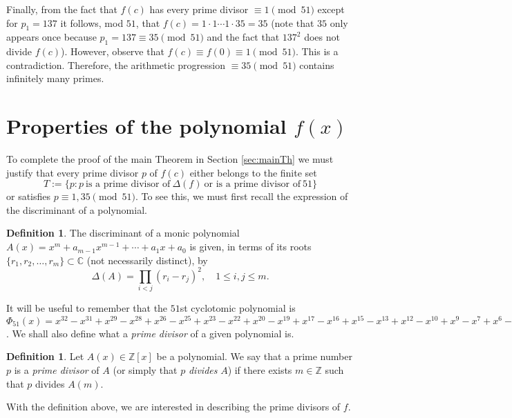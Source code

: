 \documentclass[a4paper, 12pt]{article}
\theoremstyle{definition}
\newtheorem{definition}[theorem]{Definition}
\newcommand{\Z}{\ensuremath{\mathbb{Z}}}
\newcommand{\C}{\ensuremath{\mathbb{C}}}
\begin{document}
Finally, from the fact that $f(c)$ has every prime divisor $\equiv 1 \pmod{51}$ except for $p_{1}=137$ it follows, mod $51$, that $f(c)=1\cdot1\cdots 1\cdot35=35$ (note that $35$ only appears once because $p_{1}=137\equiv35\pmod{51}$ and the fact that $137^2$ does not divide $f(c)$). However, observe that $f(c)\equiv f(0)\equiv 1\pmod{51}$. This is a contradiction. Therefore, the arithmetic progression $\equiv 35\pmod{51}$ contains infinitely many primes.

\section{Properties of the polynomial \texorpdfstring{$f(x)$}{fx}}\label{sec:properties}
 
To complete the proof of the main Theorem in Section \ref{sec:mainTh} we must justify that every prime divisor $p$ of $f(c)$ either belongs to the finite set 
\begin{equation*}
T:=\{p: p \ \text{is a prime divisor of} \ \Delta(f) \ \text{or is a prime divisor of} \ 51\}
\end{equation*}
or satisfies $p\equiv 1,35\pmod{51}$. To see this, we must first recall the expression of the discriminant of a polynomial. 
\begin{definition}
The discriminant of a monic polynomial $A(x)=x^m+a_{m-1}x^{m-1}+\cdots+a_1x+a_0$ is given, in terms of its roots $\{r_1,r_2,\dots,r_m\}\subset\C$ (not necessarily distinct), by
\begin{equation}\label{eq:discrim}
	\Delta(A)=\prod_{i<j}(r_i-r_j)^2, \quad 1\leqslant i,j\leqslant m.
\end{equation}
\end{definition}

It will be useful to remember that the $51$st cyclotomic polynomial is $\Phi_{51}(x)=x^{32} - x^{31} + x^{29} - x^{28} + x^{26} - x^{25} + x^{23} - x^{22} + x^{20} - x^{19} + x^{17} - x^{16} + x^{15} - x^{13} + x^{12} - x^{10} + x^{9} - x^{7} + x^{6} - x^{4} + x^{3} - x + 1$. We shall also define what a \emph{prime divisor} of a given polynomial is. 
\begin{definition}
Let $A(x)\in\Z[x]$ be a polynomial. We say that a prime number $p$ is a \emph{prime divisor} of $A$ (or simply that $p$ \emph{divides} $A$) if there exists $m\in\Z$ such that $p$ divides $A(m)$.
\end{definition}
With the definition above, we are interested in describing the prime divisors of $f$.
\end{document}
